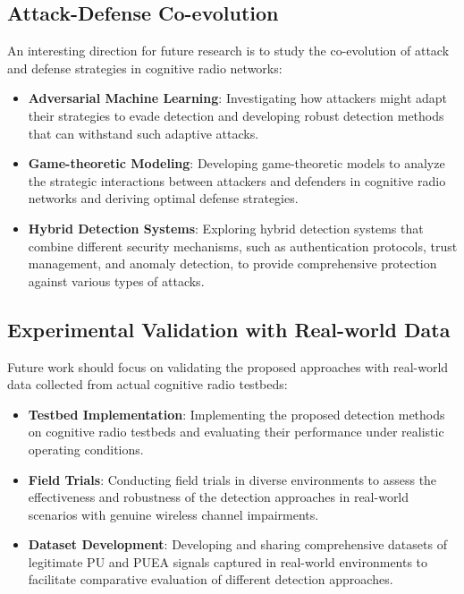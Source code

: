 \subsection{Attack-Defense Co-evolution}
An interesting direction for future research is to study the co-evolution of attack and defense strategies in cognitive radio networks:
\begin{itemize}
    \item \textbf{Adversarial Machine Learning}: Investigating how attackers might adapt their strategies to evade detection and developing robust detection methods that can withstand such adaptive attacks.
    
    \item \textbf{Game-theoretic Modeling}: Developing game-theoretic models to analyze the strategic interactions between attackers and defenders in cognitive radio networks and deriving optimal defense strategies.
    
    \item \textbf{Hybrid Detection Systems}: Exploring hybrid detection systems that combine different security mechanisms, such as authentication protocols, trust management, and anomaly detection, to provide comprehensive protection against various types of attacks.
\end{itemize}

\subsection{Experimental Validation with Real-world Data}
Future work should focus on validating the proposed approaches with real-world data collected from actual cognitive radio testbeds:
\begin{itemize}
    \item \textbf{Testbed Implementation}: Implementing the proposed detection methods on cognitive radio testbeds and evaluating their performance under realistic operating conditions.
    
    \item \textbf{Field Trials}: Conducting field trials in diverse environments to assess the effectiveness and robustness of the detection approaches in real-world scenarios with genuine wireless channel impairments.
    
    \item \textbf{Dataset Development}: Developing and sharing comprehensive datasets of legitimate PU and PUEA signals captured in real-world environments to facilitate comparative evaluation of different detection approaches.
\end{itemize}

